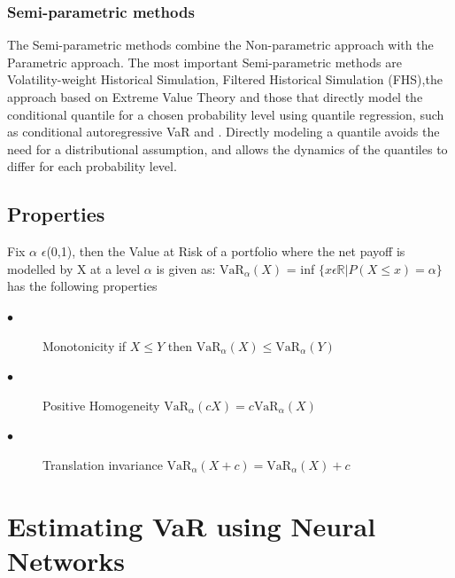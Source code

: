\documentclass[a4paper,11pt,oneside]{book}
\begin{document}
\subsection{Semi-parametric methods}
The Semi-parametric methods combine the Non-parametric
approach with the Parametric approach. The most important
Semi-parametric methods are Volatility-weight Historical Simulation,
Filtered Historical Simulation (FHS),the
approach based on Extreme Value Theory and those that directly model the conditional quantile for a chosen probability level using quantile regression, such as conditional autoregressive VaR and . Directly modeling a quantile
avoids the need for a distributional assumption, and allows
the dynamics of the quantiles to differ for each probability
level.

\section{Properties}

Fix $\alpha$ $\epsilon$(0,1), then the Value at Risk of a portfolio where the net payoff is modelled by X at a level $\alpha$ is given as:\newline
$\text{VaR}_{\alpha}(X)$ = inf $\{x \epsilon \mathbb{R}| P(X \leq x)=\alpha\}$ has the following properties
\newline

\begin{description}
	
	\item[$\bullet$] Monotonicity \newline if $X \leq Y$ then $\text{VaR}_{\alpha}(X) \leq \text{VaR}_{\alpha}(Y)$
	\item[$\bullet$] Positive Homogeneity
	\newline $\text{VaR}_{\alpha}(cX) = c\text{VaR}_{\alpha}(X)$
	\item[$\bullet$] Translation invariance
	\newline  $\text{VaR}_{\alpha}(X+c) = \text{VaR}_{\alpha}(X)+c$
	
	
\end{description}




\chapter{Estimating VaR using Neural Networks
}
\end{document}
